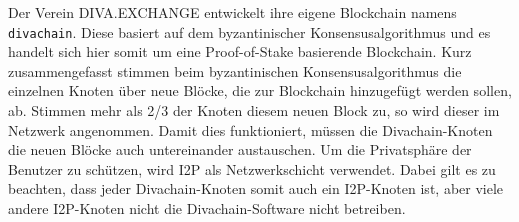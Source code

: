 Der Verein DIVA.EXCHANGE entwickelt ihre eigene Blockchain namens \lstinline|divachain|.
Diese basiert auf dem byzantinischer Konsensusalgorithmus und es handelt sich hier somit um eine Proof-of-Stake basierende Blockchain.
Kurz zusammengefasst stimmen beim byzantinischen Konsensusalgorithmus die einzelnen Knoten über neue Blöcke, die zur Blockchain hinzugefügt werden sollen, ab.
Stimmen mehr als 2/3 der Knoten diesem neuen Block zu, so wird dieser im Netzwerk angenommen.
Damit dies funktioniert, müssen die Divachain-Knoten die neuen Blöcke auch untereinander austauschen.
Um die Privatsphäre der Benutzer zu schützen, wird I2P als Netzwerkschicht verwendet.
Dabei gilt es zu beachten, dass jeder Divachain-Knoten somit auch ein I2P-Knoten ist, aber viele andere I2P-Knoten nicht die Divachain-Software nicht betreiben. 

